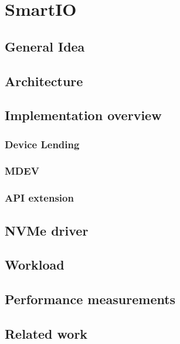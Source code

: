 \chapter{SmartIO}\label{sec:smartio}

\section{General Idea }
\section{Architecture}

\section{Implementation overview}
\subsection{Device Lending}
\subsection{MDEV}
\subsection{API extension}

\section{NVMe driver}

\section{Workload}

\section{Performance measurements}

\section{Related work}\label{sec:rw}

